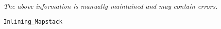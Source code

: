 \label{pkg:inlining\_mapstack}

{\tiny \it The above information is manually maintained and may contain errors.}
\begin{verbatim}
Inlining_Mapstack
\end{verbatim}
